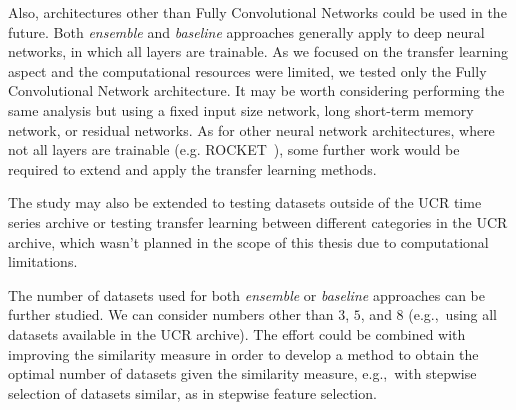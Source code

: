 \documentclass[a4paper,11pt,twoside]{report}
\theoremstyle{definition}
\begin{document}
Also, architectures other than Fully Convolutional Networks could be used in the future. Both \textit{ ensemble }and\textit{ baseline} approaches generally apply to deep neural networks, in which all layers are trainable. As we focused on the transfer learning aspect and the computational resources were limited, we tested only the Fully Convolutional Network architecture. It may be worth considering performing the same analysis but using a fixed input size network, long short-term memory network, or residual networks. As for other neural network architectures, where not all layers are trainable (e.g. ROCKET~\cite{rocket}), some further work would be required to extend and apply the transfer learning methods.

The study may also be extended to testing datasets outside of the UCR time series archive or testing transfer learning between different categories in the UCR archive, which wasn't planned in the scope of this thesis due to computational limitations.

The number of datasets used for both \textit{ensemble} or \textit{baseline} approaches can be further studied. We can consider numbers other than $3$, $5$, and $8$ (e.g.,~using all datasets available in the UCR archive). The effort could be combined with improving the similarity measure in order to develop a method to obtain the optimal number of datasets given the similarity measure, e.g.,~with stepwise selection of datasets similar, as in stepwise feature selection.





\


\thispagestyle{empty}
\end{document}
